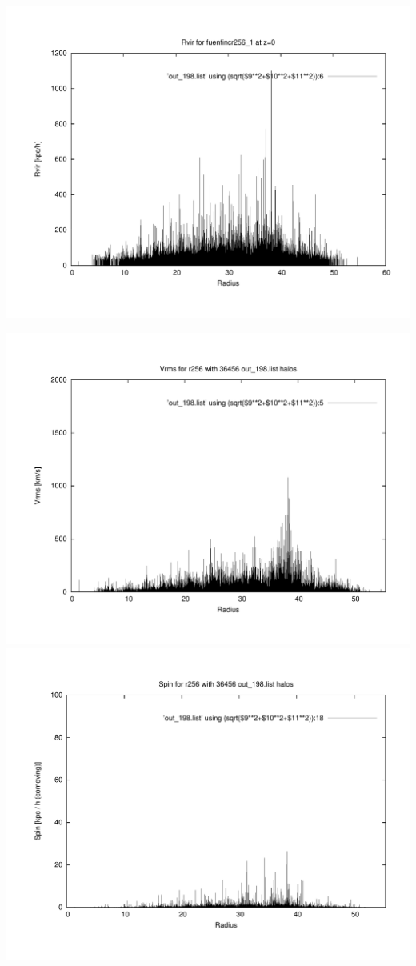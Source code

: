 \includegraphics[scale=0.3]{r256/h100/fuenfincr256_1/plot_rvir_z0.pdf}

\includegraphics[scale=0.3]{r256/h100/fuenfincr256_1/plot_Vrms_out_198.pdf}
\includegraphics[scale=0.3]{r256/h100/fuenfincr256_1/plot_spin_out_198.pdf}

